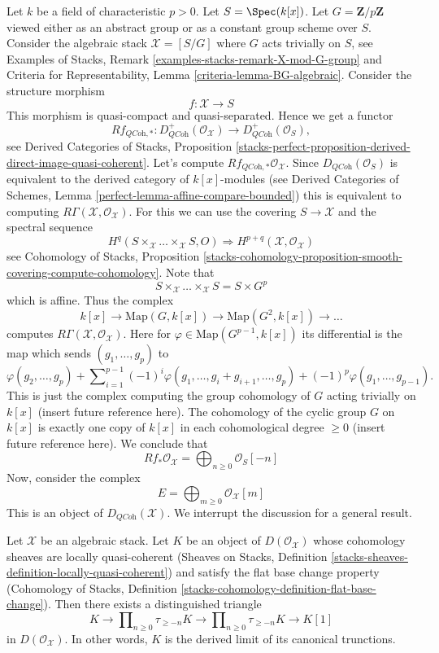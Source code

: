 \noindent
Let $k$ be a field of characteristic $p > 0$. Let $S = \Spec(k[x])$.
Let $G = \mathbf{Z}/p\mathbf{Z}$ viewed either as an abstract group
or as a constant group scheme over $S$. Consider the algebraic stack
$\mathcal{X} = [S/G]$ where $G$ acts trivially on $S$, see
Examples of Stacks, Remark \ref{examples-stacks-remark-X-mod-G-group}
and
Criteria for Representability, Lemma \ref{criteria-lemma-BG-algebraic}.
Consider the structure morphism
$$
f : \mathcal{X} \longrightarrow S
$$
This morphism is quasi-compact and quasi-separated. Hence we get a functor
$$
Rf_{\textit{QCoh}, *} :
D^{+}_{\textit{QCoh}}(\mathcal{O}_\mathcal{X})
\longrightarrow
D^{+}_{\textit{QCoh}}(\mathcal{O}_S),
$$
see 
Derived Categories of Stacks, Proposition
\ref{stacks-perfect-proposition-derived-direct-image-quasi-coherent}.
Let's compute $Rf_{\textit{QCoh}, *}\mathcal{O}_\mathcal{X}$.
Since $D_{\textit{QCoh}}(\mathcal{O}_S)$ is equivalent to
the derived category of $k[x]$-modules (see
Derived Categories of Schemes, Lemma
\ref{perfect-lemma-affine-compare-bounded})
this is equivalent to computing
$R\Gamma(\mathcal{X}, \mathcal{O}_\mathcal{X})$.
For this we can use the covering $S \to \mathcal{X}$ and the spectral
sequence
$$
H^q(S \times_\mathcal{X} \ldots \times_\mathcal{X} S, O)
\Rightarrow H^{p + q}(\mathcal{X}, \mathcal{O}_\mathcal{X})
$$
see
Cohomology of Stacks, Proposition
\ref{stacks-cohomology-proposition-smooth-covering-compute-cohomology}.
Note that
$$
S \times_\mathcal{X} \ldots \times_\mathcal{X} S = S \times G^p
$$
which is affine. Thus the complex
$$
k[x] \to \text{Map}(G, k[x]) \to \text{Map}(G^2, k[x]) \to \ldots
$$
computes $R\Gamma(\mathcal{X}, \mathcal{O}_\mathcal{X})$.
Here for $\varphi \in \text{Map}(G^{p - 1}, k[x])$ its differential is
the map which sends $(g_1, \ldots, g_p)$ to
$$
\varphi(g_2, \ldots, g_p) +
\sum\nolimits_{i = 1}^{p - 1}
(-1)^i\varphi(g_1, \ldots, g_i + g_{i + 1}, \ldots, g_p)
+ (-1)^p\varphi(g_1, \ldots, g_{p - 1}).
$$
This is just the complex computing the group cohomology of $G$ acting
trivially on $k[x]$ (insert future reference here). The cohomology of
the cyclic group $G$ on $k[x]$ is exactly one copy of $k[x]$ in each
cohomological degree $\geq 0$ (insert future reference here). We conclude
that
$$
Rf_*\mathcal{O}_\mathcal{X} = \bigoplus\nolimits_{n \geq 0} \mathcal{O}_S[-n]
$$
Now, consider the complex
$$
E = \bigoplus\nolimits_{m \geq 0} \mathcal{O}_\mathcal{X}[m]
$$
This is an object of $D_{\textit{QCoh}}(\mathcal{X})$. We interrupt the
discussion for a general result.

\begin{lemma}
\label{lemma-is-limit}
Let $\mathcal{X}$ be an algebraic stack. Let $K$ be an object of
$D(\mathcal{O}_\mathcal{X})$ whose cohomology sheaves are locally
quasi-coherent (Sheaves on Stacks, Definition
\ref{stacks-sheaves-definition-locally-quasi-coherent})
and satisfy the flat base change property (Cohomology of Stacks,
Definition \ref{stacks-cohomology-definition-flat-base-change}).
Then there exists a distinguished triangle
$$
K \to
\prod\nolimits_{n \geq 0} \tau_{\geq -n} K \to
\prod\nolimits_{n \geq 0} \tau_{\geq -n} K \to K[1]
$$
in $D(\mathcal{O}_\mathcal{X})$. In other words, $K$ is the derived
limit of its canonical trunctions.
\end{lemma}

